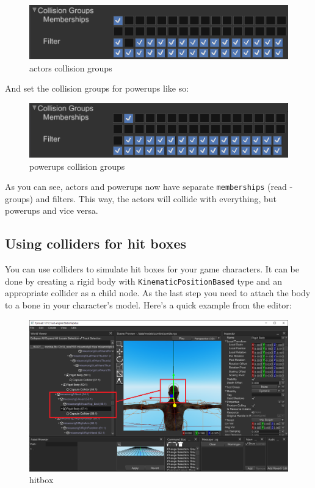 \documentclass[
]{book}
\theoremstyle{definition}
\theoremstyle{definition}
\theoremstyle{definition}
\theoremstyle{definition}
\theoremstyle{remark}
\begin{document}
\begin{figure}
\centering
\includegraphics{images/physics_collision_groups_a.png}
\caption{actors collision groups}
\end{figure}

And set the collision groups for powerups like so:

\begin{figure}
\centering
\includegraphics{images/physics_collision_groups_b.png}
\caption{powerups collision groups}
\end{figure}

As you can see, actors and powerups now have separate \texttt{memberships} (read - groups) and filters. This way, the actors will collide with everything, but powerups and vice versa.

\subsection{Using colliders for hit boxes}\label{using-colliders-for-hit-boxes}

You can use colliders to simulate hit boxes for your game characters. It can be done by creating a rigid body with \texttt{KinematicPositionBased} type and an appropriate collider as a child node. As the last step you need to attach the body to a bone in your character's model. Here's a quick example from the editor:

\begin{figure}
\centering
\includegraphics{images/physics_hitbox.png}
\caption{hitbox}
\end{figure}
\end{document}
